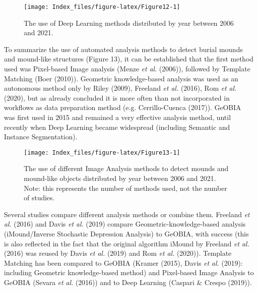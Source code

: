 \documentclass[
  12pt,
]{article}
\begin{document}
\begin{figure}

{\centering \texttt{[image: Index\_files/figure-latex/Figure12-1]} 

}

\caption{The use of Deep Learning methods distributed by year between 2006 and 2021.}\label{fig:Figure12}
\end{figure}

To summarize the use of automated analysis methods to detect burial mounds and mound-like structures (Figure 13), it can be established that the first method used was Pixel-based Image analysis (Menze \emph{et al.} (2006)), followed by Template Matching (Boer (2010)). Geometric knowledge-based analysis was used as an autonomous method only by Riley (2009), Freeland \emph{et al.} (2016), Rom \emph{et al.} (2020), but as already concluded it is more often than not incorporated in workflows as data preparation method (e.g. Cerrillo-Cuenca (2017)). GeOBIA was first used in 2015 and remained a very effective analysis method, until recently when Deep Learning became widespread (including Semantic and Instance Segmentation).

\begin{figure}

{\centering \texttt{[image: Index\_files/figure-latex/Figure13-1]} 

}

\caption{The use of different Image Analysis methods to detect mounds and mound-like objects distributed by year between 2006 and 2021. Note: this represents the number of methods used, not the number of studies.}\label{fig:Figure13}
\end{figure}

Several studies compare different analysis methods or combine them. Freeland \emph{et al.} (2016) and Davis \emph{et al.} (2019) compare Geometric-knowledge-based analysis (iMound/Inverse Stochastic Depression Analysis) to GeOBIA, with success (this is also reflected in the fact that the original algorithm iMound by Freeland \emph{et al.} (2016) was reused by Davis \emph{et al.} (2019) and Rom \emph{et al.} (2020)). Template Matching has been compared to GeOBIA (Kramer (2015), Davis \emph{et al.} (2019): including Geometric knowledge-based method) and Pixel-based Image Analysis to GeOBIA (Sevara \emph{et al.} (2016)) and to Deep Learning (Caspari \& Crespo (2019)).
\end{document}
